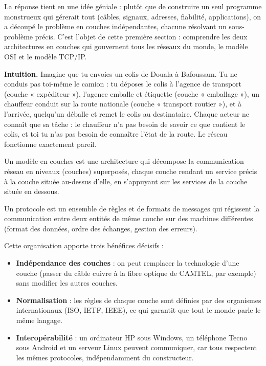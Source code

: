 \documentclass[11pt]{article}
\newcommand{\cle}[1]{{\popxbold\color{popdark}#1}}
\newcounter{popsec}
\newcounter{popsub}
\newcommand{\courssub}[1]{%
  \stepcounter{popsub}%
  \par\vspace{9pt}\noindent{\popxbold\fontsize{11.5}{13}\selectfont\color{popink}{\color{poporange}\thepopsec.\thepopsub}\hspace{6pt}#1}\par\nopagebreak\vspace{4pt}
}
\begin{document}
La réponse tient en une idée géniale : plutôt que de construire un seul programme monstrueux qui gérerait tout (câbles, signaux, adresses, fiabilité, applications), on a découpé le problème en \cle{couches} indépendantes, chacune résolvant un sous-problème précis. C'est l'objet de cette première section : comprendre les deux architectures en couches qui gouvernent tous les réseaux du monde, le modèle \cle{OSI} et le modèle \cle{TCP/IP}.

\courssub{Pourquoi une architecture en couches ?}

\textbf{Intuition.} Imagine que tu envoies un colis de Douala à Bafoussam. Tu ne conduis pas toi-même le camion : tu déposes le colis à l'agence de transport (couche « expéditeur »), l'agence emballe et étiquette (couche « emballage »), un chauffeur conduit sur la route nationale (couche « transport routier »), et à l'arrivée, quelqu'un déballe et remet le colis au destinataire. Chaque acteur ne connaît que sa tâche : le chauffeur n'a pas besoin de savoir ce que contient le colis, et toi tu n'as pas besoin de connaître l'état de la route. Le réseau fonctionne exactement pareil.

\begin{definition}
Un \cle{modèle en couches} est une architecture qui décompose la communication réseau en niveaux (couches) superposés, chaque couche rendant un service précis à la couche située au-dessus d'elle, en s'appuyant sur les services de la couche située en dessous.

Un \cle{protocole} est un ensemble de règles et de formats de messages qui régissent la communication entre deux entités de même couche sur des machines différentes (format des données, ordre des échanges, gestion des erreurs).
\end{definition}

Cette organisation apporte trois bénéfices décisifs :

\begin{itemize}
\item \textbf{Indépendance des couches} : on peut remplacer la technologie d'une couche (passer du câble cuivre à la fibre optique de CAMTEL, par exemple) sans modifier les autres couches.
\item \textbf{Normalisation} : les règles de chaque couche sont définies par des organismes internationaux (ISO, IETF, IEEE), ce qui garantit que tout le monde parle le même langage.
\item \textbf{Interopérabilité} : un ordinateur HP sous Windows, un téléphone Tecno sous Android et un serveur Linux peuvent communiquer, car tous respectent les mêmes protocoles, indépendamment du constructeur.
\end{itemize}
\end{document}
